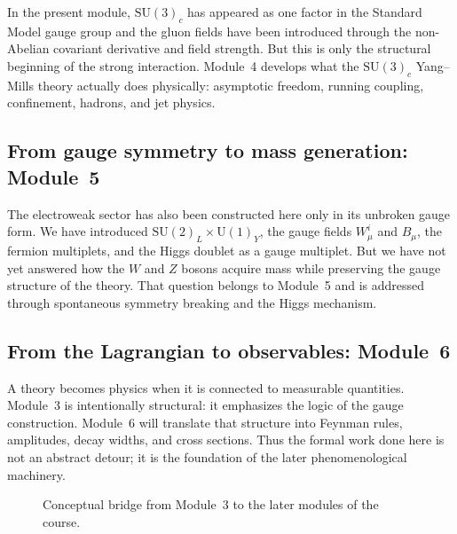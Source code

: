\documentclass[11pt,a4paper]{article}
\newcommand{\SUc}{\mathrm{SU}(3)_c}
\newcommand{\SUw}{\mathrm{SU}(2)_L}
\newcommand{\UY}{\mathrm{U}(1)_Y}
\begin{document}
In the present module, \(\SUc\) has appeared as one factor in the Standard Model gauge group and the gluon fields have been introduced through the non-Abelian covariant derivative and field strength. But this is only the structural beginning of the strong interaction. Module~4 develops what the \(\SUc\) Yang--Mills theory actually does physically: asymptotic freedom, running coupling, confinement, hadrons, and jet physics.



\subsection{From gauge symmetry to mass generation: Module~5}

The electroweak sector has also been constructed here only in its unbroken gauge form. We have introduced \(\SUw\times\UY\), the gauge fields \(W_\mu^i\) and \(B_\mu\), the fermion multiplets, and the Higgs doublet as a gauge multiplet. But we have not yet answered how the \(W\) and \(Z\) bosons acquire mass while preserving the gauge structure of the theory. That question belongs to Module~5 and is addressed through spontaneous symmetry breaking and the Higgs mechanism.



\subsection{From the Lagrangian to observables: Module~6}

A theory becomes physics when it is connected to measurable quantities. Module~3 is intentionally structural: it emphasizes the logic of the gauge construction. Module~6 will translate that structure into Feynman rules, amplitudes, decay widths, and cross sections. Thus the formal work done here is not an abstract detour; it is the foundation of the later phenomenological machinery.




\begin{figure}[H]
\centering
{}
\caption{Conceptual bridge from Module~3 to the later modules of the course.}
\label{fig:bridge-later-modules-expanded}
\end{figure}
\end{document}
